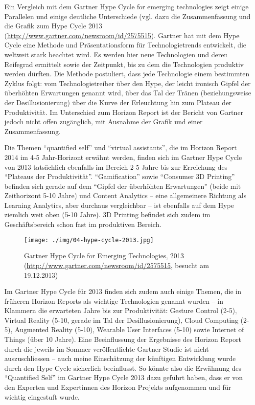 \documentclass[a4paper,
fontsize=11pt,
oneside,
numbers=noperiodatend,
parskip=half-,
bibliography=totoc,
final
]{scrartcl}
\begin{document}
Ein Vergleich mit dem Gartner Hype Cycle for emerging technologies zeigt
einige Parallelen und einige deutliche Unterschiede (vgl. dazu die
Zusammenfassung und die Grafik zum Hype Cycle 2013
(\url{http://www.gartner.com/newsroom/id/2575515}). Gartner hat mit dem
Hype Cycle eine Methode und Präsentationsform für Technologietrends
entwickelt, die weltweit stark beachtet wird. Es werden hier neue
Technologien und deren Reifegrad ermittelt sowie der Zeitpunkt, bis zu
dem die Technologien produktiv werden dürften. Die Methode postuliert,
dass jede Technologie einem bestimmten Zyklus folgt: vom
Technologietreiber über den Hype, der leicht ironisch Gipfel der
überhöhten Erwartungen genannt wird, über das Tal der Tränen
(beziehungsweise der Desillusionierung) über die Kurve der Erleuchtung
hin zum Plateau der Produktivität. Im Unterschied zum Horizon Report ist
der Bericht von Gartner jedoch nicht offen zugänglich, mit Ausnahme der
Grafik und einer Zusammenfassung.

Die Themen \enquote{quantified self} und \enquote{virtual assistants},
die im Horizon Report 2014 im 4-5 Jahr-Horizont erwähnt werden, finden
sich im Gartner Hype Cycle von 2013 tatsächlich ebenfalls im Bereich 2-5
Jahre bis zur Erreichung des \enquote{Plateaus der Produktivität}.
\enquote{Gamification} sowie \enquote{Consumer 3D Printing} befinden
sich gerade auf dem \enquote{Gipfel der überhöhten Erwartungen} (beide
mit Zeithorizont 5-10 Jahre) und Content Analytics -- eine allgemeinere
Richtung als Learning Analytics, aber durchaus vergleichbar -- ist
ebenfalls auf dem Hype ziemlich weit oben (5-10 Jahre). 3D Printing
befindet sich zudem im Geschäftsbereich schon fast im produktiven
Bereich. ~

\begin{figure}[htbp]
\centering
\texttt{[image: ./img/04-hype-cycle-2013.jpg]}
\caption{Gartner Hype Cycle for Emerging Technologies, 2013
(\url{http://www.gartner.com/newsroom/id/2575515}, besucht am
19.12.2013)}
\end{figure}

Im Gartner Hype Cycle für 2013 finden sich zudem auch einige Themen, die
in früheren Horizon Reports als wichtige Technologien genannt wurden --
in Klammern die erwarteten Jahre bis zur Produktivität: Gesture Control
(2-5), Virtual Reality (5-10, gerade im Tal der Desillusionierung),
Cloud Computing (2-5), Augmented Reality (5-10), Wearable User
Interfaces (5-10) sowie Internet of Things (über 10 Jahre). Eine
Beeinflussung der Ergebnisse des Horizon Report durch die jeweils im
Sommer veröffentlichte Gartner Studie ist nicht auszuschliessen -- auch
meine Einschätzung der künftigen Entwicklung wurde durch den Hype Cycle
sicherlich beeinflusst. So könnte also die Erwähnung des
\enquote{Quantified Self} im Gartner Hype Cycle 2013 dazu geführt haben,
dass er von den Experten und Expertinnen des Horizon Projekts
aufgenommen und für wichtig eingestuft wurde.
\end{document}
